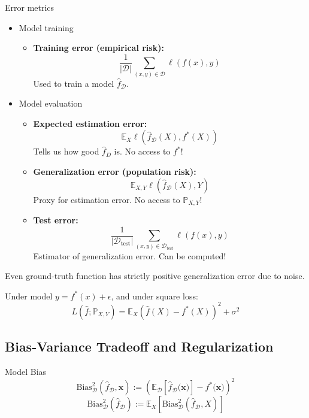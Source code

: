 \documentclass[a4paper,11pt]{article}
\def\P{\mathbb{P}}
\def\E{\mathbb{E}}
\begin{document}
\begin{subbox}{Error metrics}
    \begin{itemize}
        \item Model training
        \begin{itemize}
            \item \textbf{Training error (empirical risk):} \[
                \frac{1}{\lvert \mathcal{D} \rvert} \sum_{(x, y) \in \mathcal{D}} \ell(f(x), y)
            \] Used to train a model \( \hat{f}_\mathcal{D} \).
        \end{itemize}
    \end{itemize}
    \begin{itemize}
        \item Model evaluation
        \begin{itemize}
            \item \textbf{Expected estimation error:} \[
                \E_X \ell \left( \hat{f}_\mathcal{D}(X), f^*(X) \right)
            \] Tells us how good \( \hat{f}_D \) is. No access to \( f^* \)!
            \item \textbf{Generalization error (population risk):} \[
                \E_{X, Y} \ell \left( \hat{f}_\mathcal{D}(X), Y \right)
            \] Proxy for estimation error. No access to \( \P_{X, Y} \)!
            \item \textbf{Test error:} \[
                \frac{1}{\lvert \mathcal{D}_{\text{test}} \rvert} \sum_{(x, y) \in \mathcal{D}_\text{test}} \ell(f(x), y)
            \] Estimator of generalization error. Can be computed!
        \end{itemize}
    \end{itemize}
\end{subbox}

Even ground-truth function has strictly positive generalization error due to noise.

Under model \( y = f^*(x) + \epsilon \), and under square loss:
\[
    L \left( \hat{f}; \P_{X, Y} \right) = \E_X \left( \hat{f}(X) - f^*(X) \right)^2 + \sigma^2
\]


\subsection*{Bias-Variance Tradeoff and Regularization}

\begin{subbox}{Model Bias}
    \[
        \text{Bias}_\mathcal{D}^2 \left( \hat{f}_\mathcal{D}, \mathbf{x} \right) := \left( \E_\mathcal{D} \left[ \hat{f}_\mathcal{D}(\mathbf{x)} \right] - f^*(\mathbf{x)} \right)^2
    \]
    \[
        \text{Bias}_\mathcal{D}^2 \left( \hat{f}_\mathcal{D} \right) := \E_X \left[ \text{Bias}_\mathcal{D}^2 \left( \hat{f}_\mathcal{D}, X \right) \right]
    \]
\end{subbox}
\end{document}
